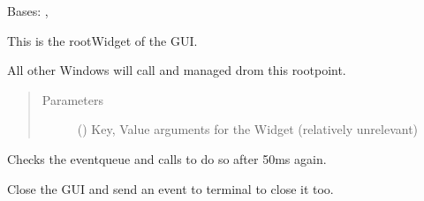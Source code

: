 \documentclass[letterpaper,10pt,english]{sphinxmanual}
\begin{document}
\begin{fulllineitems}
\label{\detokenize{anoog.automation:anoog.automation.graphical_user_interface.GUI_App}}
\sphinxAtStartPar
Bases: , {\hyperref[\detokenize{anoog.automation:anoog.automation.event.Eventsystem_Component}]{}}

\sphinxAtStartPar
This is the root\sphinxhyphen{}Widget of the GUI.

\sphinxAtStartPar
All other Windows will call and managed drom this root\sphinxhyphen{}point.
\begin{quote}\begin{description}
\item[{Parameters}] \leavevmode
\sphinxAtStartPar
{} () \textendash{} Key, Value arguments for the Widget (relatively unrelevant)

\end{description}\end{quote}

\begin{fulllineitems}
\label{\detokenize{anoog.automation:anoog.automation.graphical_user_interface.GUI_App.check_events}}
\sphinxAtStartPar
Checks the event\sphinxhyphen{}queue and calls to do so after 50ms again.

\end{fulllineitems}


\begin{fulllineitems}
\label{\detokenize{anoog.automation:anoog.automation.graphical_user_interface.GUI_App.close}}
\sphinxAtStartPar
Close the GUI and send an event to terminal to close it too.


\end{fulllineitems}
\end{fulllineitems}
\end{document}
